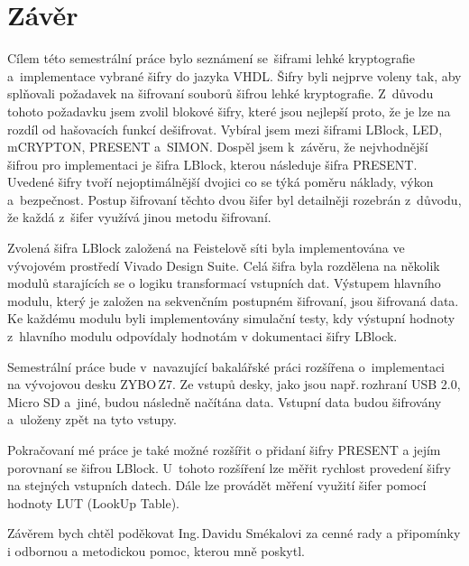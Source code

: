 \chapter*{Závěr}
{}

Cílem této semestrální práce bylo seznámení se~šiframi lehké kryptografie a~implementace vybrané šifry do jazyka VHDL. Šifry byli nejprve voleny tak, aby splňovali požadavek na šifrovaní souborů šifrou lehké kryptografie. Z~důvodu tohoto požadavku jsem zvolil blokové šifry, které jsou nejlepší proto, že je lze na rozdíl od hašovacích funkcí dešifrovat. Vybíral jsem mezi šiframi LBlock, LED, mCRYPTON, PRESENT a~SIMON. Dospěl jsem k~závěru, že nejvhodnější šifrou pro implementaci je šifra LBlock, kterou následuje šifra PRESENT. Uvedené šifry tvoří nejoptimálnější dvojici co se týká poměru náklady, výkon a~bezpečnost. Postup šifrovaní těchto dvou šifer byl detailněji rozebrán z~důvodu, že každá z~šifer využívá jinou metodu šifrovaní.

Zvolená šifra LBlock založená na Feistelově síti byla implementována ve vývojovém prostředí Vivado Design Suite. Celá šifra byla rozdělena na několik modulů starajících se o logiku transformací vstupních dat. Výstupem hlavního modulu, který je založen na sekvenčním postupném šifrovaní, jsou šifrovaná data. Ke každému modulu byli implementovány simulační testy, kdy výstupní hodnoty z~hlavního modulu odpovídaly hodnotám v dokumentaci šifry LBlock.

Semestrální práce bude v~navazující bakalářské práci rozšířena o~implementaci na vývojovou desku ZYBO\,Z7. Ze vstupů desky, jako jsou např.\,rozhraní USB 2.0, Micro SD a~jiné, budou následně načítána data. Vstupní data budou šifrovány a~uloženy zpět na tyto vstupy. 

Pokračovaní mé práce je také možné rozšířit o přidaní šifry PRESENT a jejím porovnaní se šifrou LBlock. U~tohoto rozšíření lze měřit rychlost provedení šifry na stejných vstupních datech. Dále lze provádět měření využití šifer pomocí hodnoty LUT (LookUp Table).

Závěrem bych chtěl poděkovat Ing.\,Davidu Smékalovi za cenné rady a připomínky i odbornou a metodickou pomoc, kterou mně poskytl.
